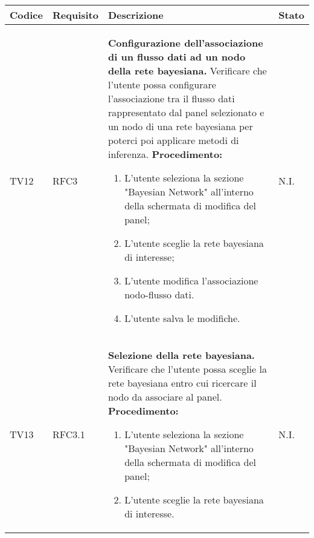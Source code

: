 \begin{table}[!htpb]
	\centering
	\renewcommand{\arraystretch}{2} 
	\begin{tabular}{|l|l|p{10cm}|l|}
		\rowcolor{orange!50}
		\hline
		\textbf{Codice} & \textbf{Requisito}& \textbf{Descrizione} & \textbf{Stato}\\ 
		\hline
		TV12 & RFC3 	&
			\textbf{Configurazione dell'associazione di un flusso dati ad un nodo della rete bayesiana.} 
			\newline
			Verificare che l’utente possa configurare l'associazione tra il flusso dati rappresentato dal panel selezionato e un nodo di una rete bayesiana per poterci poi applicare metodi di inferenza. 
			\newline 
			\textbf{Procedimento:} 
			\begin{enumerate} 
				\item L’utente seleziona la sezione "Bayesian Network" all'interno della schermata di modifica del panel; 
				\item L'utente sceglie la rete bayesiana di interesse; 
				\item L'utente modifica l'associazione nodo-flusso dati.
				\item L'utente salva le modifiche.
			\end{enumerate} 
			& N.I.\\
		\hline
		TV13 & RFC3.1 	&
			\textbf{Selezione della rete bayesiana.}
			\newline
			Verificare che l'utente possa sceglie la rete bayesiana entro cui ricercare il nodo da associare al panel.
			\newline
			\textbf{Procedimento:}
			\begin{enumerate}\item L’utente seleziona la sezione "Bayesian Network" all'interno della schermata di modifica del panel; 
				\item L’utente sceglie la rete bayesiana di interesse.
			\end{enumerate} 
			& N.I.\\
		\hline
	\end{tabular}
\end{table}
